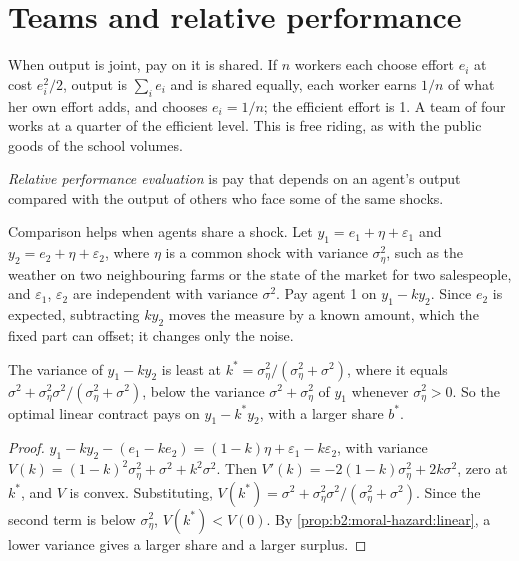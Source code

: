 \section{Teams and relative performance}\label{sec:b2:moral-hazard:teams}

When output is joint, pay on it is shared. If $n$ workers each choose effort $e_i$ at cost $e_i^2/2$, output is $\sum_i e_i$ and is
shared equally, each worker earns $1/n$ of what her own effort adds, and chooses $e_i = 1/n$; the efficient effort is 1. A team of
four works at a quarter of the efficient level. This is free riding, as with the public goods of the school volumes.

\begin{definition}\label{def:b2:moral-hazard:rpe}
\emph{Relative performance evaluation} is pay that depends on an agent's
output compared with the output of others who face some of the same shocks.
\end{definition}

Comparison helps when agents share a shock. Let $y_1 = e_1 + \eta + \varepsilon_1$ and $y_2 = e_2 + \eta + \varepsilon_2$, where $\eta$ is a common shock with variance
$\sigma_\eta^2$, such as the weather on two neighbouring farms or the state of the market for two salespeople, and $\varepsilon_1$, $\varepsilon_2$ are
independent with variance $\sigma^2$. Pay agent 1 on $y_1 - k y_2$. Since $e_2$ is expected, subtracting $ky_2$ moves the measure by a known amount,
which the fixed part can offset; it changes only the noise.

\begin{proposition}\label{prop:b2:moral-hazard:rpe}
The variance of $y_1 - ky_2$ is least at $k^* = \sigma_\eta^2/(\sigma_\eta^2 + \sigma^2)$, where it equals $\sigma^2 + \sigma_\eta^2\sigma^2/(\sigma_\eta^2 + \sigma^2)$, below the variance $\sigma^2 + \sigma_\eta^2$ of $y_1$
whenever $\sigma_\eta^2 > 0$. So the optimal linear contract pays on $y_1 - k^*y_2$, with a larger share $b^*$.
\end{proposition}

\begin{proof}
$y_1 - ky_2 - (e_1 - ke_2) = (1 - k)\eta + \varepsilon_1 - k\varepsilon_2$, with variance $V(k) = (1 - k)^2\sigma_\eta^2 + \sigma^2 + k^2\sigma^2$. Then $V'(k) = -2(1 - k)\sigma_\eta^2 +
2k\sigma^2$, zero at $k^*$, and $V$ is convex. Substituting, $V(k^*) = \sigma^2 + \sigma_\eta^2\sigma^2/(\sigma_\eta^2 + \sigma^2)$. Since the second term is below $\sigma_\eta^2$, $V(k^*) < V(0)$. By
\cref{prop:b2:moral-hazard:linear}, a lower variance gives a larger share and a larger surplus.
\end{proof}

